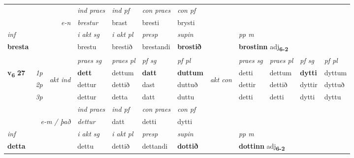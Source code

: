 \begin{longtable}[l]{X>{\footnotesize\itshape}llXXXXlXXXX}
   && &  \textit{ind praes} & \textit{ind pf} & \textit{con praes} & \textit{con pf} \\*
\multicolumn{3}{r}{\textit{e-n}} & brestur & brast & bresti & brysti \\*

\cmidrule{4-7}
   {\textit{inf}} & &  & \textit{i akt sg} & \textit{i akt pl}   & \textit{presp} & \textit{supin}  && \textit{pp m} \\*
  {\textbf{bresta}} & && brestu  & brestið   & brestandi &  \textbf{brostið}  && \multicolumn{2}{l}{\textbf{brostinn} adj\textbf{\textsubscript{6-2}}} \\*

\midrule

 & &   & \textit{praes sg}  & \textit{praes pl}    & \textit{ pf sg} & \textit{pf pl} & & \textit{praes sg}  & \textit{praes pl}    & \textit{pf sg} & \textit{pf pl }  \\ \cmidrule{4-7} \cmidrule{9-12}
 \multirow{2}{*}{{{\textbf{v{\textsubscript{6}}} \Large{\textbf{27}}}}}  & 1p & \multirow{3}{*}{\begin{turn}{90}\textit{akt ind}\end{turn}} & \textbf{dett} & dettum & \textbf{datt} & \textbf{duttum} & \multirow{3}{*}{\begin{turn}{90}\textit{akt con}\end{turn}} &detti & dettum & \textbf{dytti} & dyttum\\*
 & 2p &  &  dettur  & dettið & dast & duttuð & & dettir & dettið & dyttir & dyttuð \\*
 & 3p &  & dettur & detta & datt & duttu & & detti & detti& dytti & dyttu \\*
\cmidrule{4-7} \cmidrule{9-12}

   && &  \textit{ind praes} & \textit{ind pf} & \textit{con praes} & \textit{con pf} \\*
\multicolumn{3}{r}{\textit{e-m / það}} & dettur & datt & detti & dytti \\*

\cmidrule{4-7}
   {\textit{inf}} & &  & \textit{i akt sg} & \textit{i akt pl}   & \textit{presp} & \textit{supin}  && \textit{pp m} \\*
  {\textbf{detta}} & && dettu  & dettið   & dettandi &  \textbf{dottið}  && \multicolumn{2}{l}{\textbf{dottinn} adj\textbf{\textsubscript{6-2}}} \\*

\midrule


\end{longtable}
